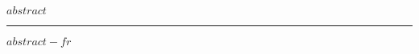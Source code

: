 \documentclass[%
    paper=A4,              %
    twoside=true,          %
    openright,             %
    parskip=half,          %
    chapterprefix=true,    %
    11pt,                  %
    headings=normal,       %
    bibliography=totoc,    %
    listof=totoc,          %
    titlepage=on,          %
    captions=tableabove,   %
    chapterprefix=false,   %
    appendixprefix=false,  %
    draft=false,           %
]{scrreprt}
\begin{document}
\cleardoublepage %


\pagestyle{empty}  %

\cleardoubleevenpage  %

\areaset[0pt]{\paperwidth}{\paperheight}  %
%
\newlength{\bcmargin}\setlength{\bcmargin}{1.4cm}  %
%
\centering
%
\null\vspace*{\dimexpr\bcmargin-\headsep\relax}
%
\begin{minipage}{\dimexpr\paperwidth-\bcmargin-\bcmargin\relax}
%
%
\par
%
$abstract$
%
\vspace{3ex}\hrule\vspace{2ex}
%
\begin{otherlanguage}{french}
%
\par
%
$abstract-fr$
%
\end{otherlanguage}
%
\end{minipage}
\fi

\end{document}
